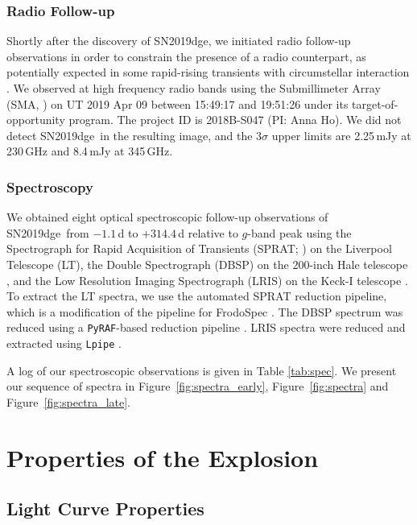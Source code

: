 \documentclass[twocolumn]{aastex63}
\newcommand{\name}{SN2019dge}
\begin{document}
\subsubsection{Radio Follow-up}
Shortly after the discovery of \name, we initiated radio follow-up observations in order to constrain the 
presence of a radio counterpart, as potentially expected in some rapid-rising transients with 
circumstellar interaction \citep{Weiler2007, Horesh2013, HoPhinney2019}. We observed at high 
frequency radio bands using the 
Submillimeter Array (SMA, \citealt{Ho2004}) on UT 2019 Apr 09 between 15:49:17 and 19:51:26 
under its target-of-opportunity program. The 
project ID is 2018B-S047 (PI: Anna Ho). We did not detect \name\ in the resulting image, and the 
3$\sigma$ upper limits are 2.25\,mJy at 230\,GHz and 8.4\,mJy at 
345\,GHz. 

\subsubsection{Spectroscopy}
We obtained eight optical spectroscopic follow-up observations of \name\ from $-1.1$\,d to 
$+314.4$\,d relative 
to $g$-band peak using the Spectrograph for Rapid Acquisition of Transients (SPRAT; 
\citealt{Piascik2014}) on the Liverpool Telescope (LT), the Double Spectrograph (DBSP) on the 
200-inch Hale telescope \citep{Oke1982}, and the Low Resolution Imaging Spectrograph (LRIS) on the 
Keck-I telescope \citep{Oke1995}. To extract the LT spectra, we use the automated SPRAT reduction 
pipeline, which is a modification of the pipeline for FrodoSpec \citep{Barnsley2012}. The DBSP spectrum 
was reduced using a \texttt{PyRAF}-based reduction pipeline \citep{Bellm2016}. LRIS 
spectra were reduced and extracted using \texttt{Lpipe} \citep{Perley2019lpipe}. 

A log of our spectroscopic observations is given in Table \ref{tab:spec}. We 
present our sequence of spectra in Figure~\ref{fig:spectra_early}, Figure~\ref{fig:spectra} and 
Figure~\ref{fig:spectra_late}.

\section{Properties of the Explosion } \label{sec:properties}
\subsection{Light Curve Properties}\label{subsec:lc_properties}
\end{document}
